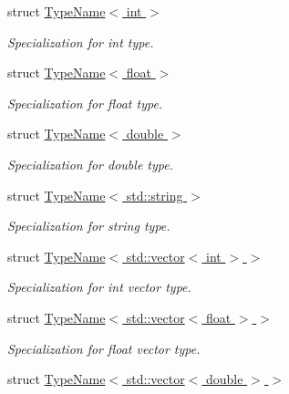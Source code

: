 \begin{DoxyCompactItemize}
struct \hyperlink{struct_d_d4hep_1_1_d_d_segmentation_1_1_type_name_3_01int_01_4}{TypeName$<$ int $>$}
\begin{DoxyCompactList}\small\item\em Specialization for int type. \item\end{DoxyCompactList}\item 
struct \hyperlink{struct_d_d4hep_1_1_d_d_segmentation_1_1_type_name_3_01float_01_4}{TypeName$<$ float $>$}
\begin{DoxyCompactList}\small\item\em Specialization for float type. \item\end{DoxyCompactList}\item 
struct \hyperlink{struct_d_d4hep_1_1_d_d_segmentation_1_1_type_name_3_01double_01_4}{TypeName$<$ double $>$}
\begin{DoxyCompactList}\small\item\em Specialization for double type. \item\end{DoxyCompactList}\item 
struct \hyperlink{struct_d_d4hep_1_1_d_d_segmentation_1_1_type_name_3_01std_1_1string_01_4}{TypeName$<$ std::string $>$}
\begin{DoxyCompactList}\small\item\em Specialization for string type. \item\end{DoxyCompactList}\item 
struct \hyperlink{struct_d_d4hep_1_1_d_d_segmentation_1_1_type_name_3_01std_1_1vector_3_01int_01_4_01_4}{TypeName$<$ std::vector$<$ int $>$ $>$}
\begin{DoxyCompactList}\small\item\em Specialization for int vector type. \item\end{DoxyCompactList}\item 
struct \hyperlink{struct_d_d4hep_1_1_d_d_segmentation_1_1_type_name_3_01std_1_1vector_3_01float_01_4_01_4}{TypeName$<$ std::vector$<$ float $>$ $>$}
\begin{DoxyCompactList}\small\item\em Specialization for float vector type. \item\end{DoxyCompactList}\item 
struct \hyperlink{struct_d_d4hep_1_1_d_d_segmentation_1_1_type_name_3_01std_1_1vector_3_01double_01_4_01_4}{TypeName$<$ std::vector$<$ double $>$ $>$}

\end{DoxyCompactItemize}
